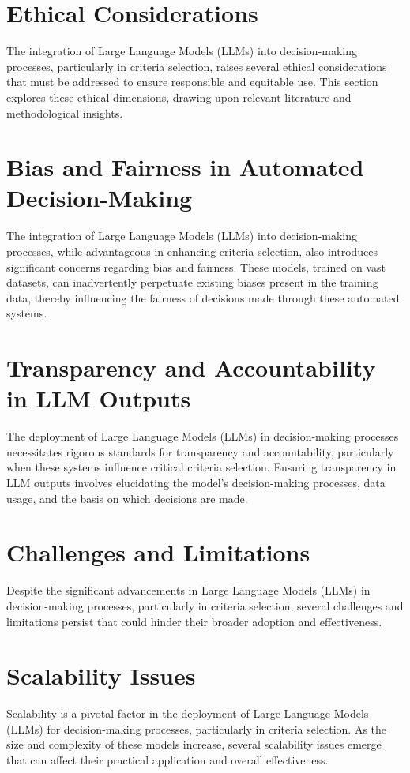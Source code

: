 \documentclass{article}
\begin{document}
\section{Ethical Considerations}
The integration of Large Language Models (LLMs) into decision-making processes, particularly in criteria selection, raises several ethical considerations that must be addressed to ensure responsible and equitable use. This section explores these ethical dimensions, drawing upon relevant literature and methodological insights.

\section{Bias and Fairness in Automated Decision-Making}
The integration of Large Language Models (LLMs) into decision-making processes, while advantageous in enhancing criteria selection, also introduces significant concerns regarding bias and fairness. These models, trained on vast datasets, can inadvertently perpetuate existing biases present in the training data, thereby influencing the fairness of decisions made through these automated systems.

\section{Transparency and Accountability in LLM Outputs}
The deployment of Large Language Models (LLMs) in decision-making processes necessitates rigorous standards for transparency and accountability, particularly when these systems influence critical criteria selection. Ensuring transparency in LLM outputs involves elucidating the model's decision-making processes, data usage, and the basis on which decisions are made.

\section{Challenges and Limitations}
Despite the significant advancements in Large Language Models (LLMs) in decision-making processes, particularly in criteria selection, several challenges and limitations persist that could hinder their broader adoption and effectiveness.

\section{Scalability Issues}
Scalability is a pivotal factor in the deployment of Large Language Models (LLMs) for decision-making processes, particularly in criteria selection. As the size and complexity of these models increase, several scalability issues emerge that can affect their practical application and overall effectiveness.
\end{document}
